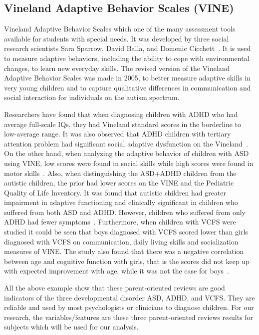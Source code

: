 \subsection{Vineland Adaptive Behavior Scales (VINE)}
Vineland Adaptive Behavior Scales which one of the many assessment tools available for students with special needs. It was developed by three social research scientists Sara Sparrow, David Balla, and Domenic Cicchett~\cite{sparrow1984vineland}. It is used to measure adaptive behaviors, including the ability to cope with environmental changes, to learn new everyday skills. The revised version of the Vineland Adaptive Behavior Scales was made in 2005, to better measure adaptive skills in very young children and to capture qualitative differences in communication and social interaction for individuals on the autism spectrum.

Researchers have found that when diagnosing children with ADHD who had average full-scale IQs, they had Vineland standard scores in the borderline to low-average range. It was also observed that ADHD children with tertiary attention problem had significant social adaptive dysfunction on the Vineland~\cite{roizen1994adaptive}. On the other hand, when analyzing the adaptive behavior of children with ASD using VINE, low scores were found in social skills while high scores were found in motor skills~\cite{yang2016vineland}. Also, when distinguishing the ASD+ADHD children from the autistic children, the prior had lower scores on the VINE and the Pediatric Quality of Life Inventory. It was found that autistic children had greater impairment in adaptive functioning and clinically significant in children who suffered from both ASD and ADHD. However, children who suffered from only ADHD had fewer symptoms~\cite{sikora2012attention}. Furthermore, when children with VCFS were studied it could be seen that boys diagnosed with VCFS scored lower than girls diagnosed with VCFS on communication, daily living skills and socialization measures of VINE. The study also found that there was a negative correlation between age and cognitive function with girls, that is the scores did not keep up with expected improvement with age, while it was not the case for boys~\cite{antshel200522q11}.

All the above example show that these parent-oriented reviews are good indicators of the three developmental disorder ASD, ADHD, and VCFS. They are reliable and used by most psychologists or clinicians to diagnose children. For our research, the variables/features are these three parent-oriented reviews results for subjects which will be used for our analysis.

